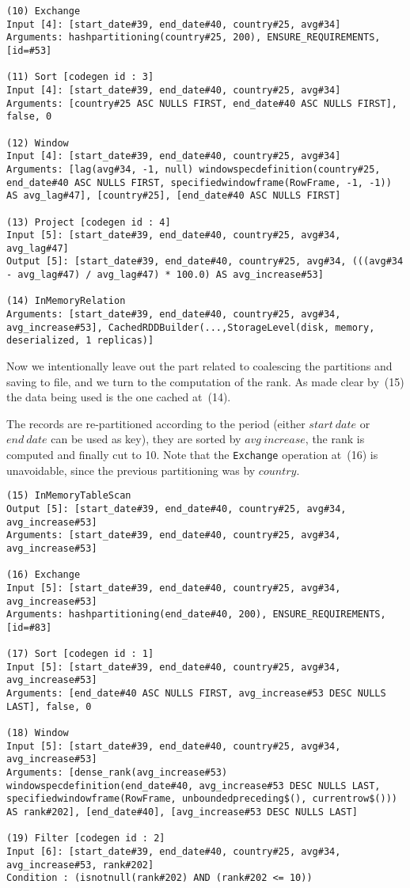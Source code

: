 \begin{lstlisting}[style=sparkplan]
(10) Exchange
Input [4]: [start_date#39, end_date#40, country#25, avg#34]
Arguments: hashpartitioning(country#25, 200), ENSURE_REQUIREMENTS, [id=#53]

(11) Sort [codegen id : 3]
Input [4]: [start_date#39, end_date#40, country#25, avg#34]
Arguments: [country#25 ASC NULLS FIRST, end_date#40 ASC NULLS FIRST], false, 0

(12) Window
Input [4]: [start_date#39, end_date#40, country#25, avg#34]
Arguments: [lag(avg#34, -1, null) windowspecdefinition(country#25, end_date#40 ASC NULLS FIRST, specifiedwindowframe(RowFrame, -1, -1)) AS avg_lag#47], [country#25], [end_date#40 ASC NULLS FIRST]

(13) Project [codegen id : 4]
Input [5]: [start_date#39, end_date#40, country#25, avg#34, avg_lag#47]
Output [5]: [start_date#39, end_date#40, country#25, avg#34, (((avg#34 - avg_lag#47) / avg_lag#47) * 100.0) AS avg_increase#53]

(14) InMemoryRelation
Arguments: [start_date#39, end_date#40, country#25, avg#34, avg_increase#53], CachedRDDBuilder(...,StorageLevel(disk, memory, deserialized, 1 replicas)]
\end{lstlisting}

\pagebreak\noindent
Now we intentionally leave out the part related to coalescing the partitions and saving to file, and we turn to the computation of the rank.
As made clear by~(15) the data being used is the one cached at~(14).

The records are re-partitioned according to the period (either $start~date$ or $end~date$ can be used as key), they are sorted by $avg~increase$, the rank is computed and finally cut to 10.
Note that the \texttt{Exchange} operation at~(16) is unavoidable, since the previous partitioning was by $country$.

\begin{lstlisting}[style=sparkplan]
(15) InMemoryTableScan
Output [5]: [start_date#39, end_date#40, country#25, avg#34, avg_increase#53]
Arguments: [start_date#39, end_date#40, country#25, avg#34, avg_increase#53]

(16) Exchange
Input [5]: [start_date#39, end_date#40, country#25, avg#34, avg_increase#53]
Arguments: hashpartitioning(end_date#40, 200), ENSURE_REQUIREMENTS, [id=#83]

(17) Sort [codegen id : 1]
Input [5]: [start_date#39, end_date#40, country#25, avg#34, avg_increase#53]
Arguments: [end_date#40 ASC NULLS FIRST, avg_increase#53 DESC NULLS LAST], false, 0

(18) Window
Input [5]: [start_date#39, end_date#40, country#25, avg#34, avg_increase#53]
Arguments: [dense_rank(avg_increase#53) windowspecdefinition(end_date#40, avg_increase#53 DESC NULLS LAST, specifiedwindowframe(RowFrame, unboundedpreceding$(), currentrow$())) AS rank#202], [end_date#40], [avg_increase#53 DESC NULLS LAST]

(19) Filter [codegen id : 2]
Input [6]: [start_date#39, end_date#40, country#25, avg#34, avg_increase#53, rank#202]
Condition : (isnotnull(rank#202) AND (rank#202 <= 10))
\end{lstlisting}